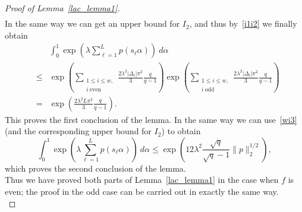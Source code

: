 \documentclass[12pt]{amsart}
\begin{document}
\begin{proof}[Proof of Lemma~\ref{lac_lemma1}]
\begin{eqnarray*}
\end{eqnarray*}
In the same way we can get an upper bound for $I_2$, and thus by~\eqref{i1i2} we finally obtain
\begin{eqnarray*}
& & \int_0^1 \exp\left(\lambda \sum_{\ell=1}^{L} p(s_\ell \alpha) \right) ~d\alpha\\
& \leq & \exp \left( \sum_{\substack{1 \leq i \leq w,\\ i ~\textrm{even}}} \frac{2 \lambda^2 |\Delta_i| \pi^2}{3} \frac{q}{q-1}\right) \exp \left( \sum_{\substack{1 \leq i \leq w,\\ i ~\textrm{odd}}} \frac{2 \lambda^2 |\Delta_i| \pi^2}{3} \frac{q}{q-1}\right) \\
& = & \exp \left( \frac{2 \lambda^2 L \pi^2}{3} \frac{q}{q-1}\right).
\end{eqnarray*}
This proves the first conclusion of the lemma. In the same way we can use~\eqref{wi3} (and the corresponding upper bound for $I_2$) to obtain
$$
\int_0^1 \exp\left(\lambda \sum_{\ell=1}^{L} p(s_\ell \alpha) \right) ~d\alpha  \leq \exp \left(12 \lambda^2 \frac{\sqrt{q}}{\sqrt{q}-1} \|p\|_2^{1/2} \right),
$$
which proves the second conclusion of the lemma.\\


Thus we have proved both parts of Lemma~\ref{lac_lemma1} in the case when $f$ is even; the proof in the odd case can be carried out in exactly the same way.\\
\end{proof}
\end{document}
